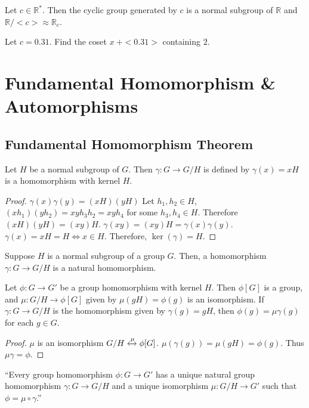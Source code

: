 \begin{remark}
	Let $c \in \mathbb{R}^*$.
	Then the cyclic group generated by $c$ is a normal subgroup of $\mathbb{R}$ and $\mathbb{R}/<c> \approx \mathbb{R}_c$.
\end{remark}

\begin{question}
	Let $c = 0.31$.
	Find the coset $x\ +<0.31>$ containing $2$.
\end{question}

\section{Fundamental Homomorphism \& Automorphisms}
\subsection{Fundamental Homomorphism Theorem}
\begin{theorem}
	Let $H$ be a normal subgroup of $G$.
	Then $\gamma : G \to G/H$ is defined by $\gamma(x) = xH$  is a homomorphism with kernel $H$.
\end{theorem}
\begin{proof}
	$\gamma(x)\gamma(y) = (xH)(yH)$
	Let $h_1,h_2 \in H$, $(xh_1)(yh_2) = xyh_3h_2 = xyh_4$ for some $h_3,h_4 \in H$.
	Therefore $(xH)(yH) = (xy)H$.
	$\gamma(xy) = (xy)H = \gamma(x)\gamma(y)$.
	$\gamma(x) = xH = H \iff x \in H$.
	Therefore, $\ker(\gamma) = H$.
\end{proof}

\begin{remark}
	Suppose $H$ is a normal subgroup of a group $G$.
	Then, a homomorphism $\gamma : G \to G/H$ is a natural homomorphism.
\end{remark}

\begin{theorem}
	Let $\phi : G \to G'$ be a group homomorphism with kernel $H$.
	Then $\phi[G]$ is a group, and $\mu : G/H \to \phi[G]$ given by $\mu(gH) = \phi(g)$ is an isomorphism.
	If $\gamma : G \to G/H$ is the homomorphism given by $\gamma(g) = gH$, then $\phi(g) = \mu\gamma(g)$ for each $g \in G$.
\end{theorem}
\begin{proof}
	$\mu$ is an isomorphism $G/H \xleftrightarrow{\mu}\phi[G]$.
	$\mu(\gamma(g)) = \mu(gH) = \phi(g)$.
	Thus $\mu\gamma = \phi$.
\end{proof}
\begin{commentary}
	``Every group homomorphism $\phi : G \to G'$ has a unique natural group homomorphism $\gamma : G \to G/H$ and a unique isomorphism $\mu : G/H \to G'$ such that $\phi = \mu \circ \gamma$.''
\end{commentary}


